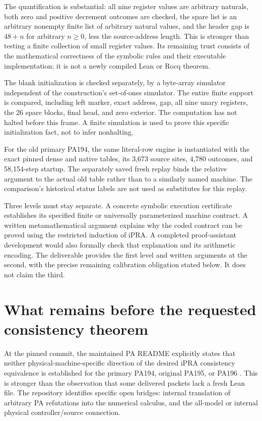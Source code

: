 \documentclass[11pt,letterpaper]{article}
\theoremstyle{definition}\newtheorem{definition}[theorem]{Definition}
\theoremstyle{remark}\newtheorem{remark}[theorem]{Remark}
\begin{document}
The quantification is substantial: all nine register values are arbitrary
naturals, both zero and positive decrement outcomes are checked, the spare
list is an arbitrary nonempty finite list of arbitrary natural values, and
the header gap is $48+n$ for arbitrary $n\geq0$, less the source-address
length. This is stronger than testing a finite collection of small register
values. Its remaining trust consists of the mathematical correctness of
the symbolic rules and their executable implementation; it is not a newly
compiled Lean or Rocq theorem.

The blank initialization is checked separately, by a byte-array simulator
independent of the construction's set-of-ones simulator. The entire finite
support is compared, including left marker, exact address, gap, all nine
unary registers, the 26 spare blocks, final head, and zero exterior. The
computation has not halted before this frame. A finite simulation is used
to prove this specific initialization fact, not to infer nonhalting.

For the old primary PA194, the same literal-row engine is instantiated with
the exact pinned dense and native tables, its 3,673 source sites, 4,780
outcomes, and 58,154-step startup. The separately saved fresh replay binds
the relative argument to the actual old table rather than to a similarly
named machine. The comparison's historical status labels are not used as
substitutes for this replay.

Three levels must stay separate. A concrete symbolic execution certificate
establishes its specified finite or universally parameterized machine
contract. A written metamathematical argument explains why the coded
contract can be proved using the restricted induction of iPRA. A completed
proof-assistant development would also formally check that explanation and
its arithmetic encoding. The deliverable provides the first level and
written arguments at the second, with the precise remaining calibration
obligation stated below. It does not claim the third.




\section{What remains before the requested consistency theorem}
\label{sec:remaining}

At the pinned commit, the maintained PA README explicitly states that
neither physical-machine-specific direction of the desired iPRA
consistency equivalence is established for the primary PA194, original
PA195, or PA196 \cite{pastatus}. This is stronger than the observation that
some delivered packets lack a fresh Lean file. The repository identifies
specific open bridges: internal translation of arbitrary PA refutations
into the numerical calculus, and the all-model or internal physical
controller/source connection.
\end{document}
